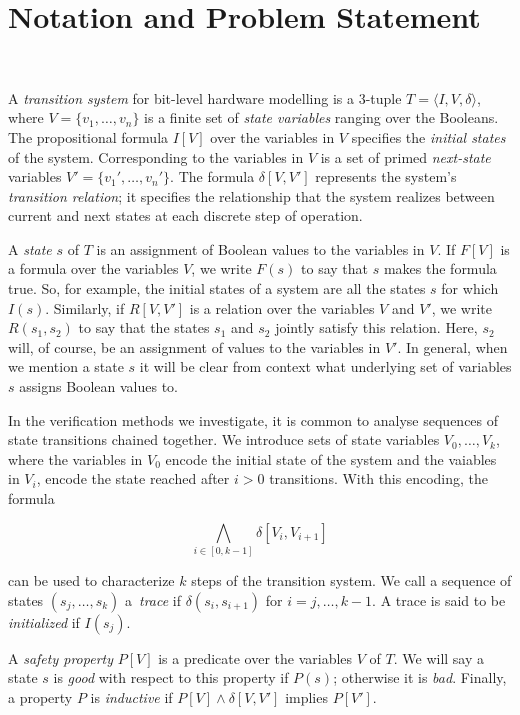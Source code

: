 \section{Notation and Problem Statement}~\label{sec:notation}

A \textit{transition system} for bit-level hardware
modelling is a 3-tuple $T = \langle I,V,\delta \rangle$, where $V = \{v_1,\dots ,v_n\}$
is a finite set of \textit{state variables} ranging over the Booleans.
The propositional formula $I[V]$ over the variables in 
$V$ specifies the \textit{initial states} of the system. 
Corresponding to the variables in $V$ is a set of primed \textit{next-state} variables $V' = \{v_1', \dots, v_n'\}$.
The formula $\delta[V,V']$ represents the system's \textit{transition relation}; it specifies the relationship that the system realizes between current and next states at each discrete step of operation.

A \textit{state} $s$ of $T$ is an assignment of Boolean values to the variables in $V$.
If $F[V]$ is a formula over the variables $V$, we write $F(s)$ to say that $s$ makes the formula true.
So, for example, the initial states of a system are all the states $s$ for which $I(s)$. Similarly, if $R[V,V']$ is a relation over the variables $V$ and $V'$, we write $R(s_1,s_2)$ to say that the states $s_1$ and $s_2$ jointly satisfy this relation. Here, $s_2$ will, of course, be an assignment of values to the variables in $V'$. In general, when we mention a state $s$
it will be clear from context what underlying set of variables $s$ assigns Boolean values to.

In the verification methods we investigate, it is common to analyse sequences of state transitions chained together.
We introduce sets of state variables $V_0, \dots, V_k$, where the variables in $V_0$ encode the initial state of the system and the vaiables in $V_i$, encode the state reached after $i>0$ transitions. With this encoding, the formula

\[ \underset{i \in [0,k-1]}{\bigwedge} \delta[V_i, V_{i+1}]\] 

\noindent can be used to characterize $k$ steps of the transition system.
We call a sequence of states $(s_j,\dots,s_k)$ a~\textit{trace}
if $\delta(s_i,s_{i{+}1})$ for $i=j,\dots,k-1$.  A trace is
said to be \textit{initialized} if $I(s_j)$.
  
A \textit{safety property} $P[V]$ is a predicate over the variables $V$ of $T$.  We will
say a state $s$ is \textit{good} with respect to this property if $P(s)$; otherwise it is \textit{bad}.
Finally, a property $P$ is \textit{inductive} if $P[V] \wedge \delta[V,V']$ implies $P[V']$.

